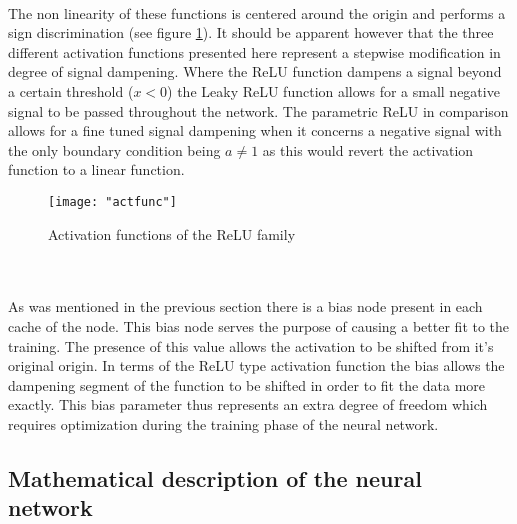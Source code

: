\documentclass[12pt]{article}
\begin{document}
\\
The non linearity of these functions is centered around the origin and performs a sign discrimination (see figure \ref{fig:relu}). It should be apparent however that the three different activation functions presented here represent a stepwise modification in  degree of signal dampening. Where the ReLU function dampens a signal beyond a certain threshold ($x<0$) the Leaky ReLU function allows for a small negative signal to be passed throughout the network. The parametric ReLU in comparison allows for a fine tuned signal dampening when it concerns a negative signal with the only boundary condition being $a \neq 1$ as this would revert the activation function to a linear function.
\begin{figure}[h]
	\centering
	\texttt{[image: "actfunc"]}
	\caption{Activation functions of the ReLU family \cite{relu}}
	\label{fig:relu}
\end{figure}
\\
\\
As was mentioned in the previous section there is a bias node present in each cache of the node. This bias node serves the purpose of causing a better fit to the training\cite{Goodfellow}. The presence of this value allows the activation to be shifted from it's original origin. In terms of the ReLU type activation function the bias allows the dampening segment of the function to be shifted in order to fit the data more exactly. This bias parameter thus represents an extra degree of freedom which requires optimization during the training phase of the neural network. 

\subsection{Mathematical description of the neural network}
\end{document}
